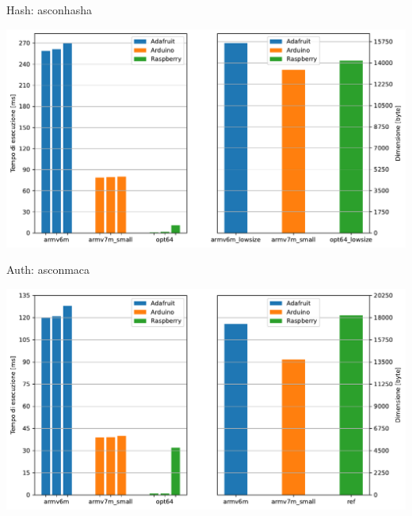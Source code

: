 \begin{frame}{Hash: asconhasha}

    \begin{center}
        \includegraphics[height=0.40\textwidth]{images/hash.pdf}
    \end{center}
    
\end{frame}


\begin{frame}{Auth: asconmaca}

    \begin{center}
        \includegraphics[height=0.40\textwidth]{images/auth.pdf}
    \end{center}
    
\end{frame}


